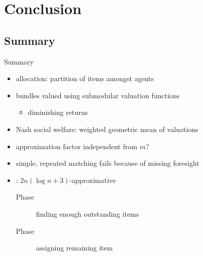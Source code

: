 \section{Conclusion}

\subsection{Summary}
\begin{frame}{Summary}
	\begin{itemize}
		\item
		allocation:
		partition of items amongst agents

		\item
		bundles valued using submodular valuation functions
		\begin{itemize}
			\item
			diminishing returns
		\end{itemize}

		\item
		Nash social welfare:
		weighted geometric mean of valuations

		\item
		approximation factor independent from \(m\)?

		\item
		simple, repeated matching fails because of missing foresight

		\item
		\RepReMatch:
		\(2n (\log n + 3)\)-approximative
		\begin{description}
			\item[Phase \phasei]
			finding enough outstanding items

			\item[Phase \phaseii]
			assigning remaining item


\end{description}
\end{itemize}
\end{frame}
